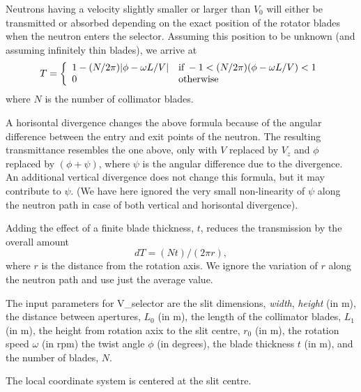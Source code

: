 Neutrons having a velocity slightly smaller or larger than $V_0$
will either be transmitted or absorbed depending on the exact position
of the rotator blades when the neutron enters the selector.
Assuming this position to be unknown (and assuming infinitely
thin blades), we arrive at
\begin{equation}
T = \left\{
 \begin{array}{ll}
 1 - (N/2\pi ) |\phi-\omega L / V| &
        {\rm if}\,  -1 < (N/2\pi )(\phi -\omega L / V) < 1 \\
    0  &  {\rm otherwise}
 \end{array} \right.
\end{equation}
where $N$ is the number of collimator blades.

A horisontal divergence changes the above formula because of the
angular difference between the entry and exit points of the neutron.
The resulting transmittance resembles the one above, only with
$V$ replaced by $V_z$ and $\phi$ replaced by $(\phi +\psi )$,
where $\psi$ is the angular difference due to
the divergence. An additional vertical divergence does not change
this formula, but it may contribute to $\psi$.
(We have here ignored the very small non-linearity of $\psi$ along the
neutron path in case of both vertical and horisontal divergence).

Adding the effect of a finite blade thickness, $t$, reduces the transmission
by the overall amount
\begin{equation}
dT = (N t) / (2\pi r ) ,
\end{equation}
where $r$ is the distance from the rotation axis. We ignore the variation
of $r$ along the neutron path and use just the average value.

The input parameters for V\_selector are the slit dimensions,
\textit{width}, \textit{height} (in m),
the distance between apertures, $L_0$ (in m), the length of the
collimator blades, $L_1$ (in m), the height from rotation axix to the slit
centre, $r_0$ (in m), the rotation speed $\omega$ (in rpm)
the twist angle $\phi$ (in degrees), the blade thickness $t$ (in m),
and the number of blades, $N$.

The local coordinate system is centered at the slit centre.

